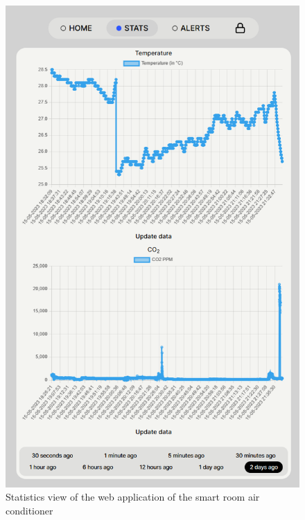 \begin{figure}
      \centerline{\includegraphics[scale=0.4]{resources/webapp-stats-view.png}}
      \caption{Statistics view of the web application of the smart room air conditioner}
      \label{webapp-stats-view}
\end{figure}

